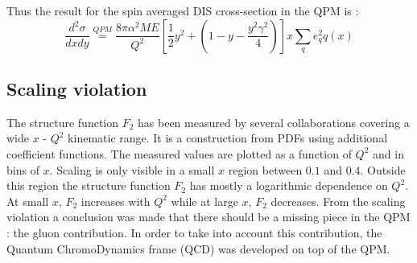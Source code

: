 Thus the result for the spin averaged DIS cross-section in the QPM is \cite{BERGER} :
%
\begin{equation}
  \frac{d^2\sigma}{dxdy} \stackrel{QPM}{=} \frac{8\pi\alpha^2ME}{Q^2}\left[\frac{1}{2}y^2+\left(1-y-\frac{y^2\gamma^2}{4}\right)\right]x\sum\limits_{q}e^2_qq(x)
\end{equation}

\subsection{Scaling violation}

The structure function $F_2$ has been measured by several collaborations covering a wide $x$ - $Q^2$ kinematic range\cite{PDG}. It is a construction from PDFs using additional coefficient functions. The measured values are plotted as a function of $Q^2$ and in bins of $x$. Scaling is only visible in a small $x$ region between $0.1$ and $0.4$. Outside this region the structure function $F_2$ has mostly a logarithmic dependence on $Q^2$. At small $x$, $F_2$ increases with $Q^2$ while at large $x$, $F_2$ decreases. From the scaling violation a conclusion was made that there should be a missing piece in the QPM : the gluon contribution. In order to take into account this contribution, the Quantum ChromoDynamics frame (QCD) was developed on top of the QPM.

